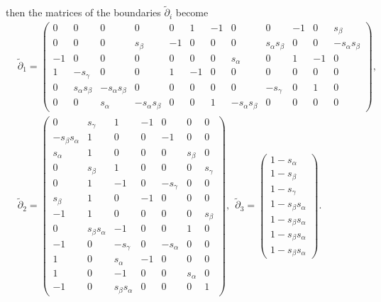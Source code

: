 \documentclass[11pt,twoside]{amsart}
\theoremstyle{plain}
\begin{document}
\normalsize{then} the matrices of the boundaries $\widetilde{\partial}_i$ become
\begin{align*}
&\widetilde{\partial}_1=\left(\begin{smallmatrix}0 & 0 & 0 & 0 & 0 & 1 & -1 & 0 & 0 & -1 & 0 & s_\beta \\
0 & 0 & 0 & s_\beta & -1 & 0 & 0 & 0 & s_\alpha s_\beta & 0 & 0 & -s_\alpha s_\beta \\
-1 & 0 & 0 & 0 & 0 & 0 & 0 & s_\alpha & 0 & 1 & -1 & 0 \\
1 & -s_\gamma & 0 & 0 & 1 & -1 & 0 & 0 & 0 & 0 & 0 & 0 \\
0 & s_\alpha s_\beta & -s_\alpha s_\beta & 0 & 0 & 0 & 0 & 0 & -s_\gamma & 0 & 1 & 0 \\
0 & 0 & s_\alpha & -s_\alpha s_\beta & 0 & 0 & 1 & -s_\alpha s_\beta & 0 & 0 & 0 & 0\end{smallmatrix}\right), \\[.5em]
&\widetilde{\partial}_2=\left(\begin{smallmatrix}
0 & s_\gamma & 1 & -1 & 0 & 0 & 0 \\
-s_\beta s_\alpha & 1 & 0 & 0 & -1 & 0 & 0 \\
s_\alpha & 1 & 0 & 0 & 0 & s_\beta & 0 \\
0 & s_\beta & 1 & 0 & 0 & 0 & s_\gamma \\
0 & 1 & -1 & 0 & -s_\gamma & 0 & 0 \\
s_\beta & 1 & 0 & -1 & 0 & 0 & 0 \\
-1 & 1 & 0 & 0 & 0 & 0 & s_\beta \\
0 & s_\beta s_\alpha & -1 & 0 & 0 & 1 & 0 \\
-1 & 0 & -s_\gamma & 0 & -s_\alpha & 0 & 0 \\
1 & 0 & s_\alpha & -1 & 0 & 0 & 0 \\
1 & 0 & -1 & 0 & 0 & s_\alpha & 0 \\
-1 & 0 & s_\beta s_\alpha & 0 & 0 & 0 & 1\end{smallmatrix}\right),~~\widetilde{\partial}_3=\left(\begin{smallmatrix}
1-s_\alpha \\
1-s_\beta \\
1-s_\gamma \\
1-s_\beta s_\alpha \\
1-s_\beta s_\alpha \\
1-s_\beta s_\alpha \\
1-s_\beta s_\alpha\end{smallmatrix}\right).
\end{align*}
\end{document}
